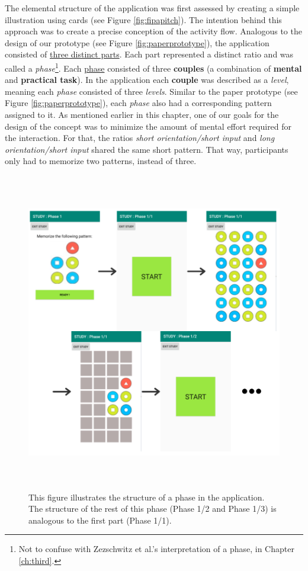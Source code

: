 The elemental structure of the application was first assessed by creating a simple illustration using cards (see Figure \ref{fig:fipapitch}). The intention behind this approach was to create a precise conception of the activity flow. Analogous to the design of our prototype (see Figure \ref{fig:paperprototype}), the application consisted of \underline{three distinct parts}. Each part represented a distinct ratio and was called a \textit{phase}\footnote{Not to confuse with Zezschwitz et al.'s interpretation of a phase, in Chapter \ref{ch:third}.}. 
Each \underline{phase} consisted of three \textbf{couples} (a combination of \textbf{mental} and \textbf{practical task}). In the application each \textbf{couple} was described as a \textit{level}, meaning each \textit{phase} consisted of three \textit{levels}. Similar to the paper prototype (see Figure \ref{fig:paperprototype}), each \textit{phase} also had a corresponding pattern assigned to it. As mentioned earlier in this chapter, one of our goals for the design of the concept was to minimize the amount of mental effort required for the interaction. For that, the ratios \textit{short orientation/short input} and \textit{long orientation/short input} shared the same short pattern. That way, participants only had to memorize two patterns, instead of three.\\

\begin{figure}[t!]
\centering
\includegraphics[width=15cm, height=14cm]{Chapters/graphics/phase.PNG}
\caption{This figure illustrates the structure of a phase in the application. The structure of the rest of this phase (Phase 1/2 and Phase 1/3) is analogous to the first part (Phase 1/1).}
\label{fig:appphase}
\end{figure}


